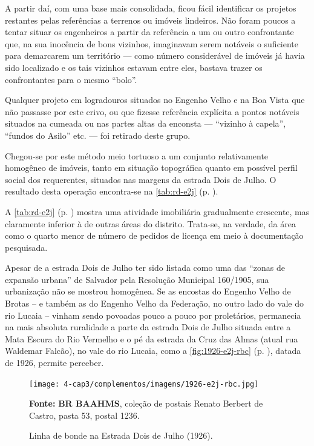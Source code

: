 A partir daí, com uma base mais consolidada, ficou fácil identificar os projetos restantes pelas referências a terrenos ou imóveis lindeiros. Não foram poucos a tentar situar os engenheiros a partir da referência a um ou outro confrontante que, na sua inocência de bons vizinhos, imaginavam serem notáveis o suficiente para demarcarem um território --- como número considerável de imóveis já havia sido localizado e os tais vizinhos estavam entre eles, bastava trazer os confrontantes para o mesmo ``bolo''. 

Qualquer projeto em logradouros situados no Engenho Velho e na Boa Vista que não passasse por este crivo, ou que fizesse referência explícita a pontos notáveis situados na cumeada ou nas partes altas da enconsta --- ``vizinho à capela'', ``fundos do Asilo'' etc. --- foi retirado deste grupo. 

Chegou-se por este método meio tortuoso a um conjunto relativamente homogêneo de imóveis, tanto em situação topográfica quanto em possível perfil social dos requerentes, situados nas margens da estrada Dois de Julho. O resultado desta operação encontra-se na \autoref{tab:rd-e2j} (p. \pageref{tab:rd-e2j}).





A \autoref{tab:rd-e2j} (p. \pageref{tab:rd-e2j}) mostra uma atividade imobiliária gradualmente crescente, mas claramente inferior à de outras áreas do distrito. Trata-se, na verdade, da área como o quarto menor de número de pedidos de licença em meio à documentação pesquisada. 

Apesar de a estrada Dois de Julho ter sido listada como uma das ``zonas de expansão urbana'' de Salvador pela Resolução Municipal 160/1905, sua urbanização não se mostrou homogênea. Se as encostas do Engenho Velho de Brotas -- e também as do Engenho Velho da Federação, no outro lado do vale do rio Lucaia -- vinham sendo povoadas pouco a pouco por proletários, permanecia na mais absoluta ruralidade a parte da estrada Dois de Julho situada entre a Mata Escura do Rio Vermelho e o pé da estrada da Cruz das Almas (atual rua Waldemar Falcão), no vale do rio Lucaia, como a \autoref{fig:1926-e2j-rbc} (p. \pageref{fig:1926-e2j-rbc}), datada de 1926, permite perceber. 

\begin{figure}[!h]
\centering
\caption{Linha de bonde na Estrada Dois de Julho (1926).}
\texttt{[image: 4-cap3/complementos/imagens/1926-e2j-rbc.jpg]}{\footnotesize \par \textbf{Fonte:} \textbf{BR BAAHMS}, coleção de postais Renato Berbert de Castro, pasta 53, postal 1236.}
\label{fig:1926-e2j-rbc}
\end{figure}

